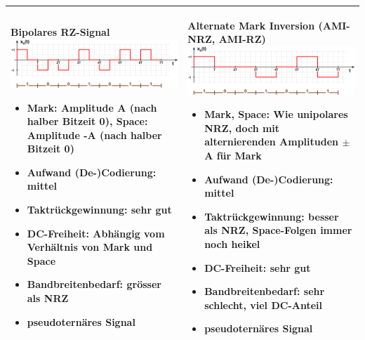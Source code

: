 \begin{longtable}{|p{9cm}|p{9cm}|}
	\textbf{Bipolares RZ-Signal}\newline
	\includegraphics[width=8cm]{bilder/DigitaleBasisbandSignale/BipolarRZ.png}\newline
	\begin{itemize}[noitemsep]
		\item \textbf{Mark:} Amplitude A (nach halber Bitzeit 0), \textbf{Space:} Amplitude -A (nach halber Bitzeit 0)
		\item \textbf{Aufwand (De-)Codierung:} mittel
		\item \textbf{Taktrückgewinnung:} sehr gut
		\item \textbf{DC-Freiheit:} Abhängig vom Verhältnis von Mark und Space
		\item \textbf{Bandbreitenbedarf:} grösser als NRZ
		\item pseudoternäres Signal
	\end{itemize}
	&
	\textbf{Alternate Mark Inversion (AMI-NRZ, AMI-RZ)}\newline
	\includegraphics[width=8cm]{bilder/DigitaleBasisbandSignale/AMI.png}\newline
	\begin{itemize}[noitemsep]
		\item \textbf{Mark, Space:} Wie unipolares NRZ, doch mit alternierenden Amplituden $\pm$A für Mark
		\item \textbf{Aufwand (De-)Codierung:} mittel
		\item \textbf{Taktrückgewinnung:} besser als NRZ, Space-Folgen immer noch heikel
		\item \textbf{DC-Freiheit:} sehr gut
		\item \textbf{Bandbreitenbedarf:} sehr schlecht, viel DC-Anteil
		\item pseudoternäres Signal
	\end{itemize}\\
	
	\hline
	

\end{longtable}
